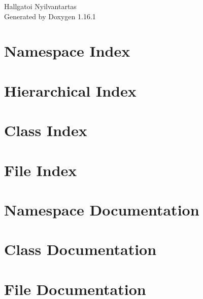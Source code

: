 \documentclass[twoside]{book}
\newcommand{\+}{\discretionary{\mbox{\scriptsize$\hookleftarrow$}}{}{}}
\newcommand{\clearemptydoublepage}{%
    \newpage{\pagestyle{empty}\cleardoublepage}%
  }
\begin{document}
  \raggedbottom
    \hypersetup{pageanchor=false,
                bookmarksnumbered=true,
                pdfencoding=unicode
               }
  \begin{titlepage}
  \vspace*{7cm}
  \begin{center}%
  {\Large Hallgatoi Nyilvantartas}\\
  \vspace*{1cm}
  {\large Generated by Doxygen 1.16.1}\\
  \end{center}
  \end{titlepage}
  \clearemptydoublepage
  \tableofcontents
  \clearemptydoublepage
  \hypersetup{pageanchor=true}
\chapter{Namespace Index}

\chapter{Hierarchical Index}

\chapter{Class Index}

\chapter{File Index}

\chapter{Namespace Documentation}

\chapter{Class Documentation}








\chapter{File Documentation}








  \backmatter
  \newpage
  \clearemptydoublepage
  \printindex
\end{document}
